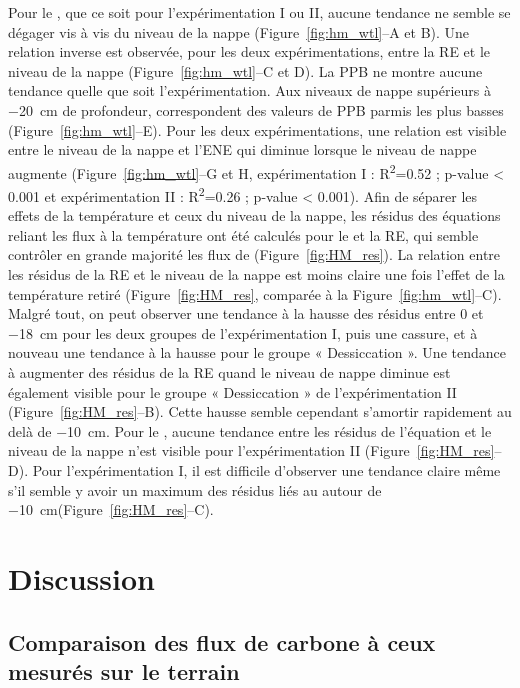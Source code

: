Pour le \chh, que ce soit pour l'expérimentation I ou II, aucune tendance ne semble se dégager vis à vis du niveau de la nappe (Figure~\ref{fig:hm_wtl}--A et B).
Une relation inverse est observée, pour les deux expérimentations, entre la RE et le niveau de la nappe (Figure~\ref{fig:hm_wtl}--C et D).
La PPB ne montre aucune tendance quelle que soit l'expérimentation.
Aux niveaux de nappe supérieurs à \SI{-20}{\centi\metre} de profondeur, correspondent des valeurs de PPB parmis les plus basses (Figure~\ref{fig:hm_wtl}--E).
Pour les deux expérimentations, une relation est visible entre le niveau de la nappe et l'ENE qui diminue lorsque le niveau de nappe augmente (Figure~\ref{fig:hm_wtl}--G et H, expérimentation I : R\textsuperscript{2}=\num{0.52} ; p-value < \num{0.001} et  expérimentation II : R\textsuperscript{2}=\num{0.26} ; p-value < \num{0.001}).
Afin de séparer les effets de la température et ceux du niveau de la nappe, les résidus des équations reliant les flux à la température ont été calculés pour le \chh et la RE, qui semble contrôler en grande majorité les flux de \coo (Figure~\ref{fig:HM_res}).
La relation entre les résidus de la RE et le niveau de la nappe est moins claire une fois l'effet de la température retiré (Figure~\ref{fig:HM_res}, comparée à la Figure~\ref{fig:hm_wtl}--C).
Malgré tout, on peut observer une tendance à la hausse des résidus entre 0 et \SI{-18}{\centi\metre} pour les deux groupes de l'expérimentation I, puis une cassure, et à nouveau une tendance à la hausse pour le groupe « Dessiccation ».
Une tendance à augmenter des résidus de la RE quand le niveau de nappe diminue est également visible pour le groupe « Dessiccation » de l'expérimentation II (Figure~\ref{fig:HM_res}--B).
Cette hausse semble cependant s'amortir rapidement au delà de \SI{-10}{\centi\metre}.
Pour le \chh, aucune tendance entre les résidus de l'équation et le niveau de la nappe n'est visible pour l'expérimentation II (Figure~\ref{fig:HM_res}--D).
Pour l'expérimentation I, il est difficile d'observer une tendance claire même s'il semble y avoir un maximum des résidus liés au \chh autour de \SI{-10}{\centi\metre}(Figure~\ref{fig:HM_res}--C).


\section{Discussion}

\subsection{Comparaison des flux de carbone à ceux mesurés sur le terrain}
